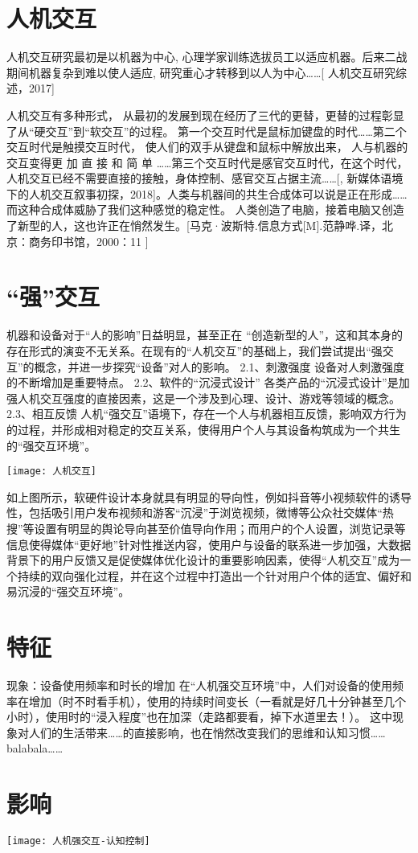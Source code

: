 \color{blue}

\section{人机交互}
人机交互研究最初是以机器为中心, 心理学家训练选拔员工以适应机器。后来二战期间机器复杂到难以使人适应, 研究重心才转移到以人为中心……[\cite{} 人机交互研究综述，2017]

人机交互有多种形式， 从最初的发展到现在经历了三代的更替，更替的过程彰显了从“硬交互”到“软交互”的过程。 第一个交互时代是鼠标加键盘的时代……第二个交互时代是触摸交互时代， 使人们的双手从键盘和鼠标中解放出来， 人与机器的交互变得更 加 直 接 和 简 单 ……第三个交互时代是感官交互时代，在这个时代，人机交互已经不需要直接的接触，身体控制、感官交互占据主流……[\cite{}, 新媒体语境下的人机交互叙事初探，2018]。人类与机器间的共生合成体可以说是正在形成……而这种合成体威胁了我们这种感觉的稳定性。 人类创造了电脑，接着电脑又创造了新型的人，这也许正在悄然发生。[\cite{}马克·波斯特.信息方式[M].范静哗.译，北京：商务印书馆，2000：11 ]

\section{“强”交互}

机器和设备对于“人的影响”日益明显，甚至正在 “创造新型的人”，这和其本身的存在形式的演变不无关系。在现有的“人机交互”的基础上，我们尝试提出“强交互”的概念，并进一步探究“设备”对人的影响。
2.1、刺激强度
	设备对人刺激强度的不断增加是重要特点。
2.2、软件的“沉浸式设计”
	各类产品的“沉浸式设计”是加强人机交互强度的直接因素，这是一个涉及到心理、设计、游戏等领域的概念。
2.3、相互反馈
人机“强交互”语境下，存在一个人与机器相互反馈，影响双方行为的过程，并形成相对稳定的交互关系，使得用户个人与其设备构筑成为一个共生的“强交互环境”。

\texttt{[image: 人机交互]}

如上图所示，软硬件设计本身就具有明显的导向性，例如抖音等小视频软件的诱导性，包括吸引用户发布视频和游客“沉浸”于浏览视频，微博等公众社交媒体“热搜”等设置有明显的舆论导向甚至价值导向作用；而用户的个人设置，浏览记录等信息使得媒体“更好地”针对性推送内容，使用户与设备的联系进一步加强，大数据背景下的用户反馈又是促使媒体优化设计的重要影响因素，使得“人机交互”成为一个持续的双向强化过程，并在这个过程中打造出一个针对用户个体的适宜、偏好和易沉浸的“强交互环境”。
\section{特征}

现象：设备使用频率和时长的增加
	在“人机强交互环境”中，人们对设备的使用频率在增加（时不时看手机），使用的持续时间变长（一看就是好几十分钟甚至几个小时），使用时的“浸入程度”也在加深（走路都要看，掉下水道里去！）。
		这中现象对人们的生活带来……的直接影响，也在悄然改变我们的思维和认知习惯……balabala……

\section{影响}
\texttt{[image: 人机强交互-认知控制]}
